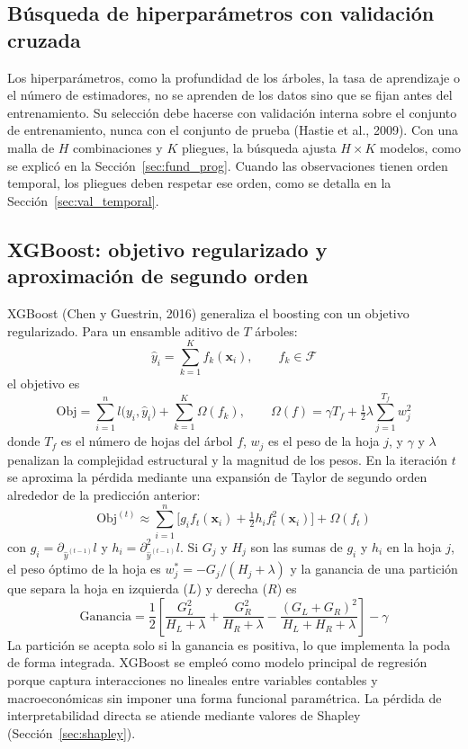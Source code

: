 \subsection{Búsqueda de hiperparámetros con validación cruzada}
Los hiperparámetros, como la profundidad de los árboles, la tasa de aprendizaje o el número de estimadores, no se aprenden de los datos sino que se fijan antes del entrenamiento. Su selección debe hacerse con validación interna sobre el conjunto de entrenamiento, nunca con el conjunto de prueba (Hastie et al., 2009). Con una malla de $H$ combinaciones y $K$ pliegues, la búsqueda ajusta $H\times K$ modelos, como se explicó en la Sección~\ref{sec:fund_prog}. Cuando las observaciones tienen orden temporal, los pliegues deben respetar ese orden, como se detalla en la Sección~\ref{sec:val_temporal}.

\subsection{XGBoost: objetivo regularizado y aproximación de segundo orden}\label{sec:xgb}
XGBoost (Chen y Guestrin, 2016) generaliza el boosting con un objetivo regularizado. Para un ensamble aditivo de $T$ árboles:
\begin{equation}
\hat{y}_i = \sum_{k=1}^{K} f_k(\mathbf{x}_i), \qquad f_k \in \mathcal{F}
\label{eq:xgb_ensamble}
\end{equation}
el objetivo es
\begin{equation}
\text{Obj} = \sum_{i=1}^n l\big(y_i,\hat{y}_i\big) + \sum_{k=1}^K \Omega(f_k), \qquad \Omega(f)=\gamma T_f + \tfrac{1}{2}\lambda \sum_{j=1}^{T_f} w_j^2
\label{eq:xgb_objetivo}
\end{equation}
donde $T_f$ es el número de hojas del árbol $f$, $w_j$ es el peso de la hoja $j$, y $\gamma$ y $\lambda$ penalizan la complejidad estructural y la magnitud de los pesos. En la iteración $t$ se aproxima la pérdida mediante una expansión de Taylor de segundo orden alrededor de la predicción anterior:
\begin{equation}
\text{Obj}^{(t)} \approx \sum_{i=1}^n \Big[g_i f_t(\mathbf{x}_i) + \tfrac{1}{2} h_i f_t^2(\mathbf{x}_i)\Big] + \Omega(f_t)
\label{eq:xgb_taylor}
\end{equation}
con $g_i = \partial_{\hat{y}^{(t-1)}} l$ y $h_i = \partial^2_{\hat{y}^{(t-1)}} l$. Si $G_j$ y $H_j$ son las sumas de $g_i$ y $h_i$ en la hoja $j$, el peso óptimo de la hoja es $w_j^{\ast} = -G_j/(H_j+\lambda)$ y la ganancia de una partición que separa la hoja en izquierda ($L$) y derecha ($R$) es
\begin{equation}
\text{Ganancia} = \frac{1}{2}\left[\frac{G_L^2}{H_L+\lambda} + \frac{G_R^2}{H_R+\lambda} - \frac{(G_L+G_R)^2}{H_L+H_R+\lambda}\right] - \gamma
\label{eq:xgb_ganancia}
\end{equation}
La partición se acepta solo si la ganancia es positiva, lo que implementa la poda de forma integrada. XGBoost se empleó como modelo principal de regresión porque captura interacciones no lineales entre variables contables y macroeconómicas sin imponer una forma funcional paramétrica. La pérdida de interpretabilidad directa se atiende mediante valores de Shapley (Sección~\ref{sec:shapley}).

